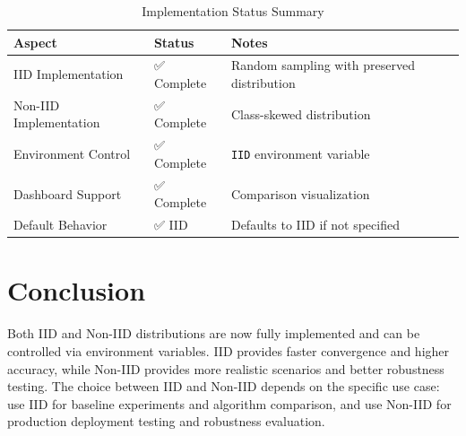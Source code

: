 \documentclass[12pt,a4paper]{article}
\begin{document}
\begin{table}[h]
\centering
\begin{tabular}{@{}lll@{}}
\toprule
\textbf{Aspect} & \textbf{Status} & \textbf{Notes} \\
\midrule
IID Implementation & ✅ Complete & Random sampling with preserved distribution \\
Non-IID Implementation & ✅ Complete & Class-skewed distribution \\
Environment Control & ✅ Complete & \texttt{IID} environment variable \\
Dashboard Support & ✅ Complete & Comparison visualization \\
Default Behavior & ✅ IID & Defaults to IID if not specified \\
\bottomrule
\end{tabular}
\caption{Implementation Status Summary}
\end{table}

\section{Conclusion}

Both IID and Non-IID distributions are now fully implemented and can be controlled via environment variables. IID provides faster convergence and higher accuracy, while Non-IID provides more realistic scenarios and better robustness testing. The choice between IID and Non-IID depends on the specific use case: use IID for baseline experiments and algorithm comparison, and use Non-IID for production deployment testing and robustness evaluation.
\end{document}
